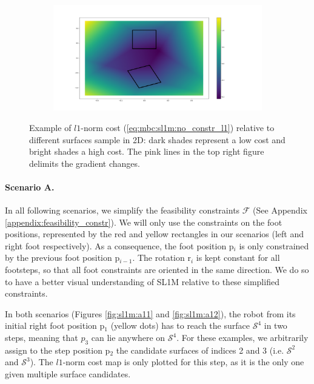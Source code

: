 \begin{figure}[ht]
\begin{subfigure}[t]{0.48\linewidth}
    \end{subfigure}
    \begin{subfigure}[t]{0.48\linewidth}
    \includegraphics[trim={5cm 2cm 12cm 2cm},clip,width=\textwidth]{Figures/Chapter_MIP_SL1M/l1_no_cst/grad_simple_rotate.png}
    \end{subfigure}
    \caption{Example of $l1$-norm cost (\ref{eq:mbc:sl1m:no_constr_l1}) relative to different surfaces sample in 2D: dark shades represent a low cost and bright shades a high cost. The pink lines in the top right figure delimits the gradient changes.}
    \label{fig:sl1m:no_constraint}
\end{figure}

\paragraph{Scenario A.}

In all following scenarios, we simplify the feasibility constraints $\mathcal{F}$ (See Appendix \ref{appendix:feasibility_constr}).
We will only use the constraints on the foot positions, represented by the red and yellow rectangles in our scenarios (left and right foot respectively).
As a consequence, the foot position p$_i$ is only constrained by the previous foot position p$_{i-1}$.
The rotation r$_i$ is kept constant for all footsteps, so that all foot constraints are oriented in the same direction.
We do so to have a better visual understanding of SL1M relative to these simplified constraints.

In both scenarios (Figures \ref{fig:sl1m:a11} and \ref{fig:sl1m:a12}), the robot from its initial right foot position p$_1$ (yellow dots) has to reach the surface $\mathcal{S}^4$ in two steps, meaning that $p_3$ can lie anywhere on $\mathcal{S}^4$. 
For these examples, we arbitrarily assign to the step position p$_2$ the candidate surfaces of indices 2 and 3 (i.e. $\mathcal{S}^2$ and $\mathcal{S}^3$). The $l1$-norm cost map is only plotted for this step, as it is the only one given multiple surface candidates.


